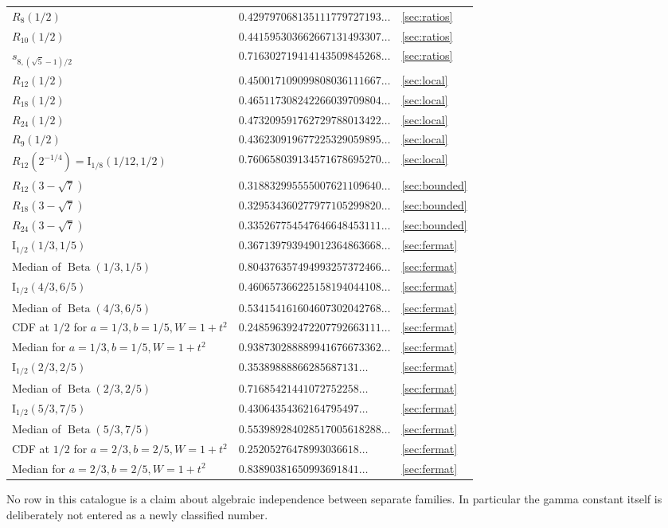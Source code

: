 \documentclass[11pt,a4paper]{article}
\numberwithin{equation}{section}
\theoremstyle{definition}
\theoremstyle{remark}
\begin{document}
\begin{longtable}{@{}P{0.48\textwidth}P{0.36\textwidth}P{0.09\textwidth}@{}}
$R_8(1/2)$ &
$0.429797068135111779727193\ldots$ & \ref{sec:ratios}\\
$R_{10}(1/2)$ &
$0.441595303662667131493307\ldots$ & \ref{sec:ratios}\\
$s_{8,(\sqrt5-1)/2}$ &
$0.716302719414143509845268\ldots$ & \ref{sec:ratios}\\
$R_{12}(1/2)$ &
$0.450017109099808036111667\ldots$ & \ref{sec:local}\\
$R_{18}(1/2)$ &
$0.465117308242266039709804\ldots$ & \ref{sec:local}\\
$R_{24}(1/2)$ &
$0.473209591762729788013422\ldots$ & \ref{sec:local}\\
$R_9(1/2)$ &
$0.436230919677225329059895\ldots$ & \ref{sec:local}\\
$R_{12}(2^{-1/4})=\mathrm I_{1/8}(1/12,1/2)$ &
$0.760658039134571678695270\ldots$ & \ref{sec:local}\\
$R_{12}(3-\sqrt7)$ &
$0.318832995555007621109640\ldots$ & \ref{sec:bounded}\\
$R_{18}(3-\sqrt7)$ &
$0.329534360277977105299820\ldots$ & \ref{sec:bounded}\\
$R_{24}(3-\sqrt7)$ &
$0.335267754547646648453111\ldots$ & \ref{sec:bounded}\\
$\mathrm I_{1/2}(1/3,1/5)$ &
$0.367139793949012364863668\ldots$ & \ref{sec:fermat}\\
Median of $\operatorname{Beta}(1/3,1/5)$ &
$0.804376357494993257372466\ldots$ & \ref{sec:fermat}\\
$\mathrm I_{1/2}(4/3,6/5)$ &
$0.460657366225158194044108\ldots$ & \ref{sec:fermat}\\
Median of $\operatorname{Beta}(4/3,6/5)$ &
$0.534154161604607302042768\ldots$ & \ref{sec:fermat}\\
CDF at $1/2$ for $a=1/3,b=1/5,W=1+t^2$ &
$0.248596392472207792663111\ldots$ & \ref{sec:fermat}\\
Median for $a=1/3,b=1/5,W=1+t^2$ &
$0.938730288889941676673362\ldots$ & \ref{sec:fermat}\\
$\mathrm I_{1/2}(2/3,2/5)$ &
$0.35389888866285687131\ldots$ & \ref{sec:fermat}\\
Median of $\operatorname{Beta}(2/3,2/5)$ &
$0.71685421441072752258\ldots$ & \ref{sec:fermat}\\
$\mathrm I_{1/2}(5/3,7/5)$ &
$0.43064354362164795497\ldots$ & \ref{sec:fermat}\\
Median of $\operatorname{Beta}(5/3,7/5)$ &
$0.553989284028517005618288\ldots$ & \ref{sec:fermat}\\
CDF at $1/2$ for $a=2/3,b=2/5,W=1+t^2$ &
$0.25205276478993036618\ldots$ & \ref{sec:fermat}\\
Median for $a=2/3,b=2/5,W=1+t^2$ &
$0.83890381650993691841\ldots$ & \ref{sec:fermat}\\
\bottomrule
\end{longtable}
No row in this catalogue is a claim about algebraic independence between
separate families. In particular the gamma constant itself is deliberately
not entered as a newly classified number.
\end{document}
